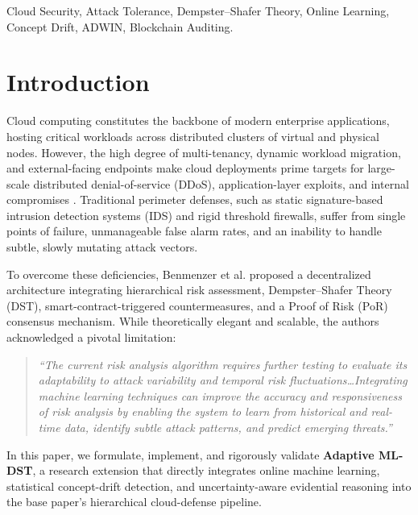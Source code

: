 \documentclass[conference]{IEEEtran}
\begin{document}
\begin{IEEEkeywords}
Cloud Security, Attack Tolerance, Dempster--Shafer Theory, Online Learning, Concept Drift, ADWIN, Blockchain Auditing.
\end{IEEEkeywords}

\section{Introduction}
Cloud computing constitutes the backbone of modern enterprise applications, hosting critical workloads across distributed clusters of virtual and physical nodes. However, the high degree of multi-tenancy, dynamic workload migration, and external-facing endpoints make cloud deployments prime targets for large-scale distributed denial-of-service (DDoS), application-layer exploits, and internal compromises \cite{benmenzer2025reinforcing, sharafaldin2018toward}. Traditional perimeter defenses, such as static signature-based intrusion detection systems (IDS) and rigid threshold firewalls, suffer from single points of failure, unmanageable false alarm rates, and an inability to handle subtle, slowly mutating attack vectors.

To overcome these deficiencies, Benmenzer et al. \cite{benmenzer2025reinforcing} proposed a decentralized architecture integrating hierarchical risk assessment, Dempster--Shafer Theory (DST), smart-contract-triggered countermeasures, and a Proof of Risk (PoR) consensus mechanism. While theoretically elegant and scalable, the authors acknowledged a pivotal limitation:
\begin{quote}
\textit{``The current risk analysis algorithm requires further testing to evaluate its adaptability to attack variability and temporal risk fluctuations\dots Integrating machine learning techniques can improve the accuracy and responsiveness of risk analysis by enabling the system to learn from historical and real-time data, identify subtle attack patterns, and predict emerging threats.''} \cite[p.~30]{benmenzer2025reinforcing}
\end{quote}

In this paper, we formulate, implement, and rigorously validate \textbf{Adaptive ML-DST}, a research extension that directly integrates online machine learning, statistical concept-drift detection, and uncertainty-aware evidential reasoning into the base paper's hierarchical cloud-defense pipeline.
\end{document}

